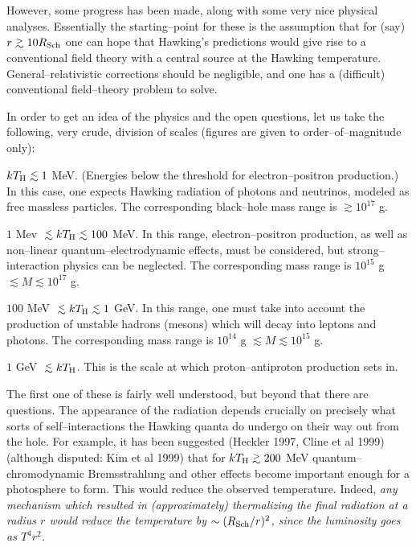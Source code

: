 However, some progress has been made, along with some very nice
physical analyses.  Essentially the starting--point for these is the
assumption that for (say) $r\gtrsim 10 R_{\rm Sch}$ one can hope that
Hawking's predictions would give rise to a conventional field theory
with a central source at the Hawking temperature.
General--relativistic corrections should be negligible, and one has a
(difficult) conventional field--theory problem to solve.

In order to get an idea of the physics and the open questions, let us take the
following, very crude, division of scales (figures are given to
order--of--magnitude only):

\itemitem{}\qquad $kT_{\rm H}\lesssim 1$ MeV.  (Energies below the threshold
for electron--positron production.)  In this case, one expects Hawking
radiation of photons and neutrinos, modeled as free massless particles.  The
corresponding black--hole mass range is $\gtrsim 10^{17}$ g.

\itemitem{}\qquad $1$ Mev $\lesssim kT_{\rm H}\lesssim 100$ MeV.  In this
range, electron--positron production, as well as non--linear
quantum--electrodynamic effects, must be considered, but strong--interaction
physics can be neglected.  The corresponding mass range is $10^{15}$ g
$\lesssim M\lesssim 10^{17}$ g.

\itemitem{}\qquad $100$ MeV $\lesssim kT_{\rm H}\lesssim 1$ GeV.  In this range,
one must take into account the production of unstable hadrons (mesons) which
will decay into leptons and photons.  The corresponding mass range is $10^{14}$
g $\lesssim M\lesssim 10^{15}$ g.

\itemitem{}\qquad $1$ GeV $\lesssim kT_{\rm H}$.  This is the scale at which
proton--antiproton production sets in.  

The first one of these is fairly well understood, but beyond that there are
questions.   The appearance of the radiation depends crucially on precisely
what sorts of self--interactions the Hawking quanta do undergo on their way out
from the hole. For example, it has been suggested (Heckler 1997, Cline et al
1999)  (although disputed:  Kim et al 1999) that for $kT_{\rm H}\gtrsim 200$
MeV quantum--chromodynamic Bremsstrahlung and other effects become important
enough for a photosphere to form.  This would reduce the observed temperature. 
Indeed, \it any \rm mechanism which resulted in (approximately) thermalizing
the final radiation at a radius $r$ would reduce the temperature by $\sim
(R_{\rm Sch}/r)^2$, since the luminosity goes as $T^4r^2$.

